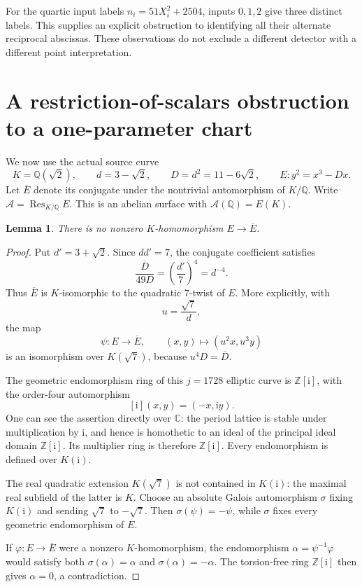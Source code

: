 \documentclass[11pt]{article}
\newtheorem{lemma}[theorem]{Lemma}
\newcommand{\Q}{\mathbb Q}
\newcommand{\Z}{\mathbb Z}
\newcommand{\Res}{\operatorname{Res}}
\begin{document}
For the quartic input labels
\(n_i=51X_i^2+2504\), inputs \(0,1,2\) give three
distinct labels. This supplies an explicit obstruction
to identifying all their alternate reciprocal
abscissas. These observations do not exclude a
different detector with a different point interpretation.

\section{A restriction-of-scalars obstruction to a one-parameter chart}
\label{sec:restriction}

We now use the actual source curve
\[
 K=\Q(\sqrt2),\qquad d=3-\sqrt2,\qquad
 D=d^2=11-6\sqrt2,\qquad E:y^2=x^3-Dx.
\]
Let \(\overline E\) denote its conjugate under the
nontrivial automorphism of \(K/\Q\). Write
\(\mathcal A=\Res_{K/\Q}E\).
This is an abelian surface with
\(\mathcal A(\Q)=E(K)\).

\begin{lemma}\label{lem:noisogeny}
There is no nonzero \(K\)-homomorphism
\(E\longrightarrow\overline E\).
\end{lemma}
\begin{proof}
Put \(d'=3+\sqrt2\). Since \(dd'=7\), the conjugate
coefficient satisfies
\[
                  \frac{\overline D}{49D}
                      =\left(\frac{d'}7\right)^4
                      =d^{-4}.
\]
Thus \(\overline E\) is \(K\)-isomorphic to the
quadratic 7-twist of \(E\). More explicitly, with
\[
                         u=\frac{\sqrt7}{d},
\]
the map
\[
              \psi:E\longrightarrow\overline E,\qquad
              (x,y)\longmapsto(u^2x,u^3y)
\]
is an isomorphism over \(K(\sqrt7)\), because
\(u^4D=\overline D\).

The geometric endomorphism ring of this \(j=1728\)
elliptic curve is \(\Z[\mathrm i]\), with the
order-four automorphism
\[
                       [\mathrm i](x,y)=(-x,\mathrm i y).
\]
One can see the assertion directly over \(\mathbb C\):
the period lattice is stable under multiplication
by \(\mathrm i\), and hence is homothetic to an ideal
of the principal ideal domain \(\Z[\mathrm i]\).
Its multiplier ring is therefore \(\Z[\mathrm i]\).
Every endomorphism is defined over \(K(\mathrm i)\).

The real quadratic extension \(K(\sqrt7)\) is not
contained in \(K(\mathrm i)\): the maximal real
subfield of the latter is \(K\). Choose an absolute
Galois automorphism \(\sigma\) fixing \(K(\mathrm i)\)
and sending \(\sqrt7\) to \(-\sqrt7\). Then
\(\sigma(\psi)=-\psi\), while \(\sigma\) fixes every
geometric endomorphism of \(E\).

If \(\varphi:E\to\overline E\) were a nonzero
\(K\)-homomorphism, the endomorphism
\(\alpha=\psi^{-1}\varphi\) would satisfy both
\(\sigma(\alpha)=\alpha\) and
\(\sigma(\alpha)=-\alpha\). The torsion-free ring
\(\Z[\mathrm i]\) then gives \(\alpha=0\), a
contradiction.
\end{proof}
\end{document}
